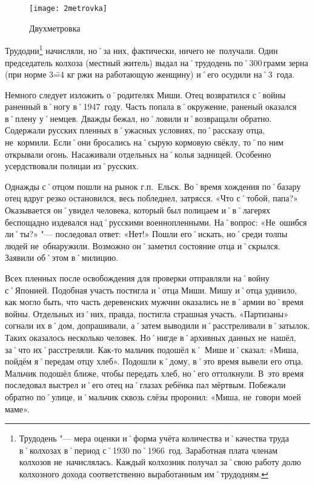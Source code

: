 \begin{wrapfigure}{O}{.25\textwidth}
\centering
\texttt{[image: 2metrovka]}
\caption[Двухметровка]{Двухметровка\footnotemark}
\label{fig:2metrovka}
\end{wrapfigure}

Трудодни\footnote{Трудодень "--- мера оценки и˚форма учёта количества и˚качества труда в˚колхозах в˚период с˚1930 по˚1966~год. Заработная плата членам колхозов не~начислялась. Каждый колхозник получал за˚свою работу долю колхозного дохода соответственно выработанным им˚трудодням.} начисляли, но˚за них, фактически, ничего не~получали. Один председатель колхоза (местный житель) выдал на˚трудодень по˚300\,грамм зерна (при норме 3\==4 кг ржи на работающую женщину) и˚его осудили на˚3~года.

Немного следует изложить о˚родителях Миши. Отец возвратился с˚войны раненный в˚ногу в˚1947~году. Часть попала в˚окружение, раненый оказался в˚плену у˚немцев. Дважды бежал, но˚ловили и˚возвращали обратно. Содержали русских пленных в˚ужасных условиях, по˚рассказу отца, не~кормили. Если˚они бросались на˚сырую кормовую свёклу, то˚по ним открывали огонь. Насаживали отдельных на˚колья задницей. Особенно усердствовали полицаи из˚русских. 

Однажды с˚отцом пошли на рынок г.п.~Ельск. Во˚время хождения по˚базару отец вдруг резко остановился, весь побледнел, затрясся. «Что с˚тобой, папа?» Оказывается он˚увидел человека, который был полицаем и˚в˚лагерях беспощадно издевался над˚русскими военнопленными. На˚вопрос: «Не~ошибся ли˚ты?» "--- последовал ответ: «Нет!» Пошли его˚искать, но˚среди толпы людей не~обнаружили. Возможно он˚заметил состояние отца и˚скрылся. Заявили об˚этом в˚милицию.

Всех пленных после освобождения для проверки отправляли на˚войну с˚Японией. Подобная участь постигла и˚отца Миши. Мишу и˚отца удивило, как могло быть, что часть деревенских мужчин оказались не в˚армии во˚время войны. Отдельных из˚них, правда, постигла страшная участь. «Партизаны» согнали их в˚дом, допрашивали, а˚затем выводили и˚расстреливали в˚затылок. Таких оказалось несколько человек. Но˚нигде в˚архивных данных не~нашёл, за˚что их˚расстреляли. Как-то мальчик подошёл к˚ Мише и˚сказал: «Миша, пойдём я˚передам отцу хлеб». Подошли к˚дому, в˚это время вывели его отца. Мальчик подошёл ближе, чтобы передать хлеб, но˚его оттолкнули. В~это время последовал выстрел и˚его отец на˚глазах ребёнка пал мёртвым. Побежали обратно по˚улице, и˚мальчик сквозь слёзы проронил: «Миша, не~говори моей маме». 

